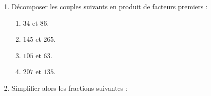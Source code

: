 \begin{exercice*}    
    \begin{enumerate}
        \item Décomposer les couples suivants en produit de facteurs premiers :
        \begin{multicols}{2}                
            \begin{enumerate}
                \item $34$ et $86$.
                \item $145$ et $265$.
                \item $105$ et $63$.
                \item $207$ et $135$.
            \end{enumerate}
        \end{multicols}
        \item Simplifier alors les fractions suivantes :
        \begin{multicols}{2}
            \begin{enumerate}
            \end{enumerate}                                
        \end{multicols}
    \end{enumerate}                       
\end{exercice*}
